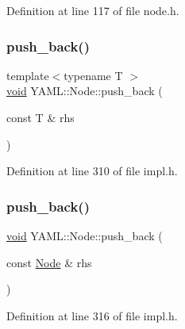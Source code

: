 Definition at line 117 of file node.\+h.

\mbox{\label{class_y_a_m_l_1_1_node_a9ba45abe5334123051997c5de5d92e5a}} 
\subsubsection{\texorpdfstring{push\_back()}{push\_back()}\hspace{0.1cm}{\footnotesize\ttfamily [1/2]}}
{\footnotesize\ttfamily template$<$typename T $>$ \\
\mbox{\hyperlink{glad_8h_a950fc91edb4504f62f1c577bf4727c29}{void}} Y\+A\+M\+L\+::\+Node\+::push\+\_\+back (\begin{DoxyParamCaption}\item[{const T \&}]{rhs }\end{DoxyParamCaption})\hspace{0.3cm}{\ttfamily [inline]}}



Definition at line 310 of file impl.\+h.

\mbox{\label{class_y_a_m_l_1_1_node_a619341edc51fadf84fd7e9a34699c210}} 
\subsubsection{\texorpdfstring{push\_back()}{push\_back()}\hspace{0.1cm}{\footnotesize\ttfamily [2/2]}}
{\footnotesize\ttfamily \mbox{\hyperlink{glad_8h_a950fc91edb4504f62f1c577bf4727c29}{void}} Y\+A\+M\+L\+::\+Node\+::push\+\_\+back (\begin{DoxyParamCaption}\item[{const \mbox{\hyperlink{class_y_a_m_l_1_1_node}{Node}} \&}]{rhs }\end{DoxyParamCaption})\hspace{0.3cm}{\ttfamily [inline]}}



Definition at line 316 of file impl.\+h.

\mbox{\label{class_y_a_m_l_1_1_node_ab27ee6ca788d596ed47b33d32a47708d}} 
